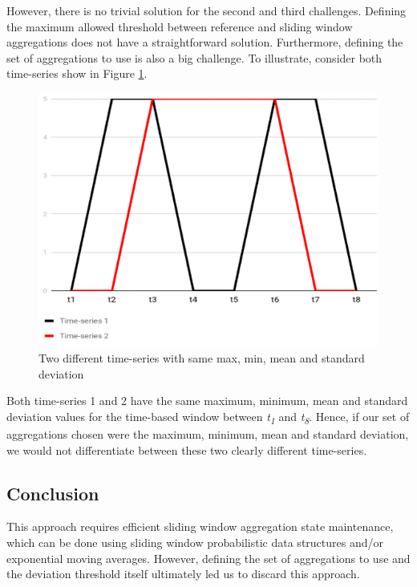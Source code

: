 However, there is no trivial solution for the second and third challenges. Defining the maximum allowed threshold between reference and sliding window aggregations does not have a straightforward solution. Furthermore, defining the set of aggregations to use is also a big challenge. To illustrate, consider both time-series show in Figure \ref{fig:approach2-timeseries}.
 
\begin{figure}[!htb]
    \begin{center}
      \includegraphics[scale=0.7]{figures/approach2-timeseries.png}
      \caption[]{Two different time-series with same max, min, mean and standard deviation}
      \label{fig:approach2-timeseries}
    \end{center}
\end{figure}


Both time-series 1 and 2 have the same maximum, minimum, mean and standard deviation values for the time-based window between \textit{t\textsubscript{1}} and \textit{t\textsubscript{8}}. Hence, if our set of aggregations chosen were the maximum, minimum, mean and standard deviation, we would not differentiate between these two clearly different time-series.

\subsection*{Conclusion}
This approach requires efficient sliding window aggregation state maintenance, which can be done using sliding window probabilistic data structures and/or exponential moving averages. However, defining the set of aggregations to use and the deviation threshold itself ultimately led us to discard this approach.


